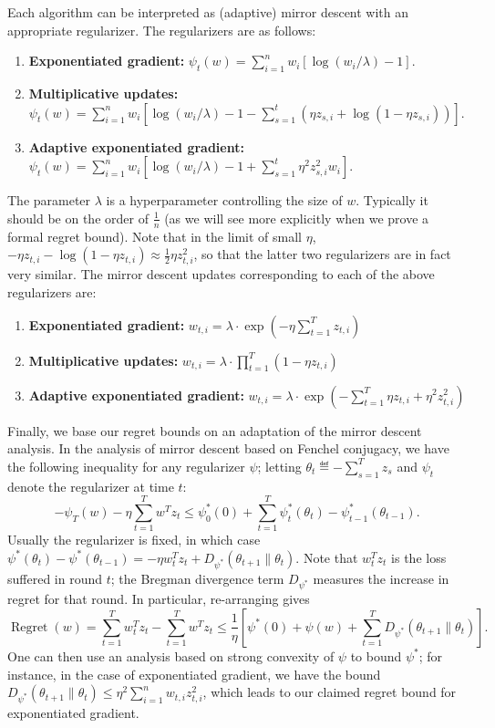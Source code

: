 \documentclass[11pt]{article}
\DeclareMathOperator{\Regret}{Regret}
\begin{document}
Each algorithm can be interpreted as (adaptive) mirror descent with an appropriate 
regularizer. The regularizers are as follows:
\begin{enumerate}
        \item \textbf{Exponentiated gradient:} $\psi_t(w) = \sum_{i=1}^n w_i[\log(w_i/\lambda)-1]$.
        \item \textbf{Multiplicative updates:} $\psi_t(w) = \sum_{i=1}^n w_i[\log(w_i/\lambda)-1-\sum_{s=1}^t (\eta z_{s,i} + \log(1-\eta z_{s,i}))]$.
        \item \textbf{Adaptive exponentiated gradient:} $\psi_t(w) = \sum_{i=1}^n w_i[\log(w_i/\lambda)-1+\sum_{s=1}^t \eta^2 z_{s,i}^2 w_i]$.
\end{enumerate}
The parameter $\lambda$ is a hyperparameter controlling the size of $w$. Typically it should be on the order of $\frac{1}{n}$ 
(as we will see more explicitly when we prove a formal regret bound). Note that in the limit of small $\eta$, 
$-\eta z_{t,i} - \log(1-\eta z_{t,i}) \approx \frac{1}{2}\eta z_{t,i}^2$, so that 
the latter two regularizers are in fact very similar. The mirror descent updates corresponding 
to each of the above regularizers are:
\begin{enumerate}
        \item \textbf{Exponentiated gradient:} $w_{t,i} = \lambda \cdot \exp\left(-\eta \sum_{t=1}^T z_{t,i}\right)$
        \item \textbf{Multiplicative updates:} $w_{t,i} = \lambda \cdot \prod_{t=1}^T (1- \eta z_{t,i})$
        \item \textbf{Adaptive exponentiated gradient:} $w_{t,i} = \lambda \cdot \exp\left(- \sum_{t=1}^T \eta z_{t,i} + \eta^2 z_{t,i}^2\right)$
\end{enumerate}
Finally, we base our regret bounds on an adaptation of the mirror descent analysis. In the analysis of 
mirror descent based on Fenchel conjugacy, we have the following inequality for any regularizer $\psi$; 
letting $\theta_t \eqdef -\sum_{s=1}^T z_s$ and $\psi_t$ denote the regularizer at time $t$:
\begin{equation}
        \label{eqn:bound1}
        -\psi_T(w) - \eta \sum_{t=1}^T w^T z_t \leq \psi_0^*(0) + \sum_{t=1}^T \psi_t^*(\theta_t) - \psi_{t-1}^*(\theta_{t-1}).
\end{equation}
Usually the regularizer is fixed, in which case $\psi^*(\theta_t) - \psi^*(\theta_{t-1}) = -\eta w_t^Tz_t + D_{\psi^*}(\theta_{t+1} \| \theta_t)$. 
Note that $w_t^Tz_t$ is the loss suffered in round $t$; the Bregman divergence term $D_{\psi^*}$ measures the increase in regret for that round. 
In particular, re-arranging gives
\begin{equation}
        \label{eqn:bound2}
        \Regret(w) = \sum_{t=1}^T w_t^Tz_t - \sum_{t=1}^T w^Tz_t \leq \frac{1}{\eta}\left[ \psi^*(0) + \psi(w) + \sum_{t=1}^T D_{\psi^*}(\theta_{t+1} \| \theta_t)\right].
\end{equation}
One can then use an analysis based on strong convexity of $\psi$ to bound $\psi^*$; for instance, in the case of exponentiated gradient, 
we have the bound $D_{\psi^*}(\theta_{t+1} \| \theta_t) \leq \eta^2 \sum_{i=1}^n w_{t,i}z_{t,i}^2$, which leads to our claimed regret bound 
for exponentiated gradient.
\end{document}
